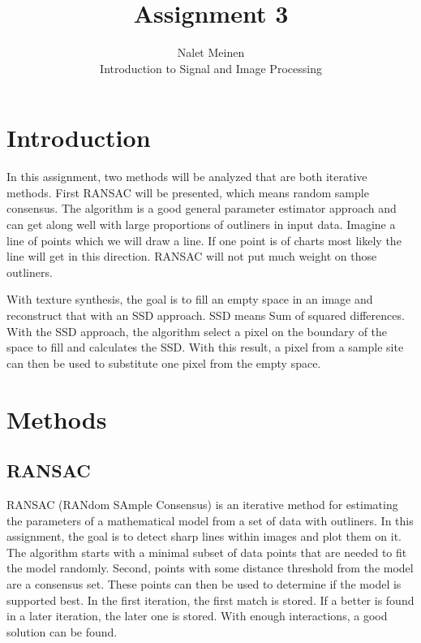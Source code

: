 \documentclass[12pt]{article}
\begin{document}


\title{Assignment 3}%
\author{Nalet Meinen\\ %
Introduction to Signal and Image Processing
}

\maketitle

\tableofcontents
\pagebreak
\section{Introduction}
In this assignment, two methods will be analyzed that are both iterative methods. First RANSAC will be presented, which means random sample consensus. The algorithm is a good general parameter estimator approach and can get along well with large proportions of outliners in input data. Imagine a line of points which we will draw a line. If one point is of charts most likely the line will get in this direction. RANSAC will not put much weight on those outliners.

With texture synthesis, the goal is to fill an empty space in an image and reconstruct that with an SSD approach. SSD means Sum of squared differences. With the SSD approach, the algorithm select a pixel on the boundary of the space to fill and calculates the SSD. With this result, a pixel from a sample site can then be used to substitute one pixel from the empty space.

\section{Methods}

\subsection{RANSAC}
RANSAC (RANdom SAmple Consensus) is an iterative method for estimating the parameters of a mathematical model from a set of data with outliners. In this assignment, the goal is to detect sharp lines within images and plot them on it. The algorithm starts with a minimal subset of data points that are needed to fit the model randomly. Second, points with some distance threshold from the model are a consensus set. These points can then be used to determine if the model is supported best. In the first iteration, the first match is stored. If a better is found in a later iteration, the later one is stored. With enough interactions, a good solution can be found.
\end{document}
